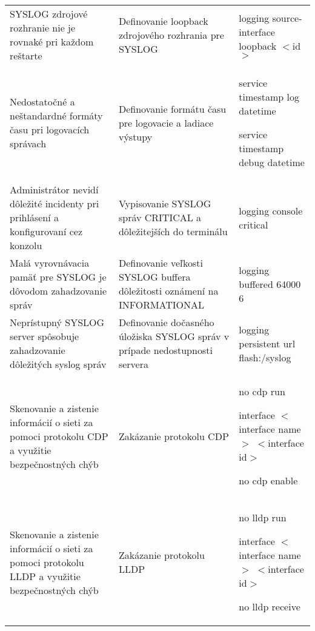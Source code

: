 \begin{longtable}[!htbp]{|L{10em}L{10em}>{\selectfont}L{34em}|}
	
	
	
	 SYSLOG zdrojové rozhranie nie je rovnaké pri každom reštarte	& Definovanie loopback zdrojového rozhrania pre SYSLOG	&logging source-interface loopback $<$id$>$\\
	
	
	
	Nedostatočné a neštandardné formáty času pri logovacích správach	&Definovanie formátu času pre logovacie a ladiace výstupy	&service timestamp log datetime
	
	service timestamp debug datetime\\
	
	
	
	
	 Administrátor nevidí dôležité incidenty pri prihlásení a konfigurovaní cez konzolu	&Vypisovanie SYSLOG správ CRITICAL a dôležitejších do terminálu	&logging console critical\\
	
	
	
	
	Malá vyrovnávacia pamäť pre SYSLOG je dôvodom zahadzovanie správ	&Definovanie veľkosti SYSLOG buffera dôležitosti oznámení na INFORMATIONAL	&logging buffered 64000 6\\
	
	
	
	
	 Neprístupný SYSLOG server spôsobuje zahadzovanie dôležitých syslog správ	&Definovanie dočasného úložiska SYSLOG správ v prípade nedostupnosti servera	&logging persistent url flash:/syslog\\
	
	
	
	
	Skenovanie a zistenie informácií o sieti za pomoci protokolu CDP a využitie bezpečnostných chýb	&Zakázanie protokolu CDP	&no cdp run
	
	
	interface $<$interface name$>$ $<$interface id$>$ 
	
	\hspace{0.5em}no cdp enable\\
	
	
	
	
	 Skenovanie a zistenie informácií o sieti za pomoci protokolu LLDP a využitie bezpečnostných chýb	&Zakázanie protokolu LLDP	&no lldp run
	
	interface $<$interface name$>$ $<$interface id$>$	
	
	\hspace{0.5em}no lldp receive 
	

\end{longtable}
